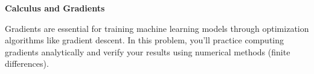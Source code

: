 \item {\bf Calculus and Gradients}

Gradients are essential for training machine learning models through optimization algorithms like gradient descent. In this problem, you'll practice computing gradients analytically and verify your results using numerical methods (finite differences).

\begin{enumerate}

  

  

  

  

  

\end{enumerate}
